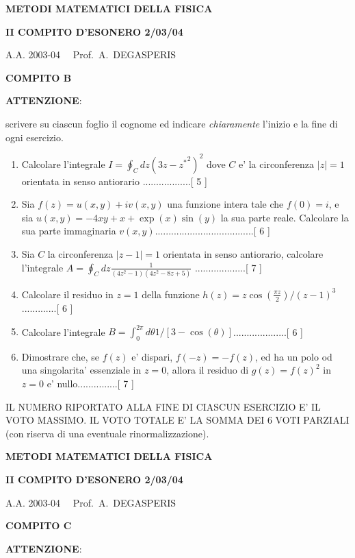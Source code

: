 \documentclass[,12pt]{article}
\begin{document}
\centerline{\bf{METODI MATEMATICI DELLA FISICA}}

\centerline{\bf{II COMPITO D'ESONERO 2/03/04}}

\centerline{A.A. 2003-04 \ \ Prof.\ A.\ DEGASPERIS}

\centerline{\bf{COMPITO B}}

\vspace{20pt}
\noindent
{\bf ATTENZIONE}:

\noindent
scrivere su ciascun foglio il cognome ed indicare
\emph{chiaramente} l'inizio e la fine di ogni esercizio.
\vspace{20pt}
\noindent
\begin{enumerate}
\item Calcolare l'integrale $I=\oint_Cdz(3z-{z^\ast}^2)^2$ dove $C$ e' la
circonferenza $|z|=1$ orientata in senso antiorario 
..................[ 5 ] 
\item Sia $f(z)=u(x,y)+iv(x,y)$ una funzione intera
tale che $f(0)=i$, e sia $u(x,y)=-4xy+x+\exp(x)
\sin(y)$ la sua parte reale. Calcolare la sua
parte immaginaria $v(x,y)$.....................................[ 6 ]
\item Sia $C$ la
circonferenza $|z-1|=1$ orientata in senso antiorario, calcolare
l'integrale
$A=\oint_Cdz\frac{1}{(4z^2-1)(4z^2-8z+5)}$
...................[ 7 ]  
\item Calcolare il residuo in $z=1$ della funzione
$h(z)=z\cos(\frac{\pi
z}{2})/(z-1)^3$.............[ 6 ]
\item Calcolare l'integrale
$B=\int_{0}^{2\pi}d\theta 1/[3-\cos(\theta )]$....................[ 6 ]
\item Dimostrare che, se $f(z)$ e' dispari, $f(-z)=-f(z)$, ed ha un polo
od una singolarita'
essenziale in $z=0$, allora il residuo di $g(z)=f(z)^2$ in $z=0$ e'
nullo...............[ 7 ]
\end{enumerate}
\vspace{20pt}

\noindent IL NUMERO RIPORTATO ALLA FINE DI CIASCUN ESERCIZIO
E' IL VOTO MASSIMO. IL VOTO TOTALE E' LA SOMMA DEI 6 VOTI
PARZIALI (con riserva di una eventuale rinormalizzazione).

\newpage

\centerline{\bf{METODI MATEMATICI DELLA FISICA}}

\centerline{\bf{II COMPITO D'ESONERO 2/03/04}}

\centerline{A.A. 2003-04 \ \ Prof.\ A.\ DEGASPERIS}

\centerline{\bf{COMPITO C}}
\vspace{20pt}
\noindent
{\bf ATTENZIONE}:
\end{document}
